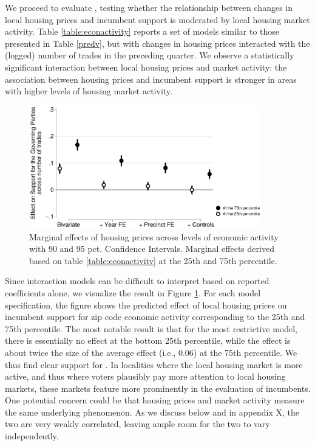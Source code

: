 \documentclass[12pt,a4paper]{article}
\begin{document}
	
	
	
	
	We proceed to evaluate \htwo, testing whether the relationship between changes in local housing prices and incumbent support is moderated by local housing market activity. Table \ref{table:econactivity} reports a set of models similar to those presented in Table \ref{predv}, but with changes in housing prices interacted with the (logged) number of trades in the preceding quarter. We observe a statistically significant interaction between local housing prices and market activity: the association between housing prices and incumbent support is stronger in areas with higher levels of housing market activity. 
	
	
	
	
	\begin{figure}[htbp!]
		\includegraphics[width=0.9\textwidth]{../figures/localactivity.eps}
		\centering
		\caption{Marginal effects of housing prices across levels of economic activity with 90  and 95 pct. Confidence Intervals.  Marginal effects derived based on table \ref{table:econactivity} at the 25th and 75th percentile.}\label{localactivity}
	\end{figure}
	
	Since interaction models can be difficult to interpret based on reported coefficients alone, we visualize the result in Figure \ref{localactivity}. For each model specification, the figure shows the predicted effect of local housing prices on incumbent support for zip code economic activity corresponding to  the 25th and 75th percentile. The most notable result is that for the most restrictive model, there is essentially no effect at the bottom 25th percentile, while the effect is about twice the size of the average effect  (i.e., 0.06) at the 75th percentile. We thus find clear support for \htwo. In localities where the local housing market is more active, and thus where voters plausibly pay more attention to local housing markets, these markets feature more prominently in the evaluation of incumbents. One potential concern could be that housing prices and market activity measure the same underlying phenomenon. As we discuss below and in appendix X, the two are very weakly correlated, leaving ample room for the two to vary independently.
	
\end{document}

